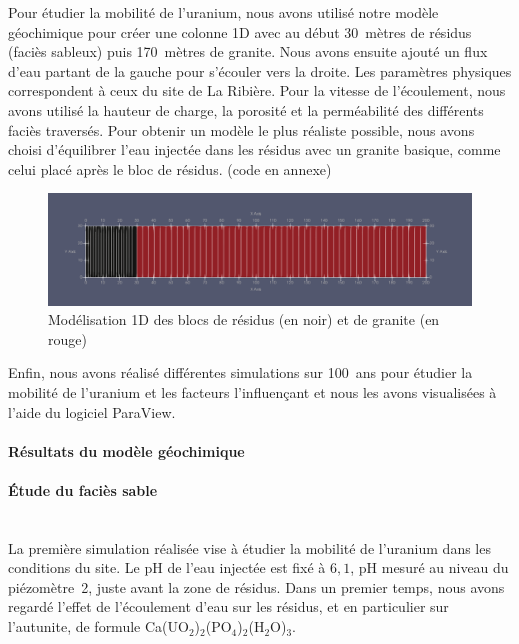 \documentclass{article}
\begin{document}
Pour étudier la mobilité de l’uranium, nous avons utilisé notre modèle géochimique pour créer une colonne 1D avec au début 30~mètres de résidus (faciès sableux) puis 170~mètres de granite. Nous avons ensuite ajouté un flux d’eau partant de la gauche pour s’écouler vers la droite. Les paramètres physiques correspondent à ceux du site de La Ribière. Pour la vitesse de l’écoulement, nous avons utilisé la hauteur de charge, la porosité et la perméabilité des différents faciès traversés. Pour obtenir un modèle le plus réaliste possible, nous avons choisi d’équilibrer l’eau injectée dans les résidus avec un granite basique, comme celui placé après le bloc de résidus. (code en annexe)


\begin{figure}[H]
    \centering
    \includegraphics[width=0.9\linewidth]{III_B_2_1.png}
    \caption{Modélisation 1D des blocs de résidus (en noir) et de granite (en rouge)}
    \label{fig:modele_bloc}
\end{figure}

Enfin, nous avons réalisé différentes simulations sur 100~ans pour étudier la mobilité de l’uranium et les facteurs l’influençant et nous les avons visualisées à l’aide du logiciel ParaView.


\paragraph{Résultats du modèle géochimique}

\paragraph{Étude du faciès sable \\ \\}
La première simulation réalisée vise à étudier la mobilité de l’uranium dans les conditions du site. Le pH de l’eau injectée est fixé à $6,1$, pH mesuré au niveau du piézomètre~2, juste avant la zone de résidus. Dans un premier temps, nous avons regardé l’effet de l’écoulement d’eau sur les résidus, et en particulier sur l’autunite, de formule Ca(UO$_2$)$_2$(PO$_4$)$_2$(H$_2$O)$_3$.
\end{document}
